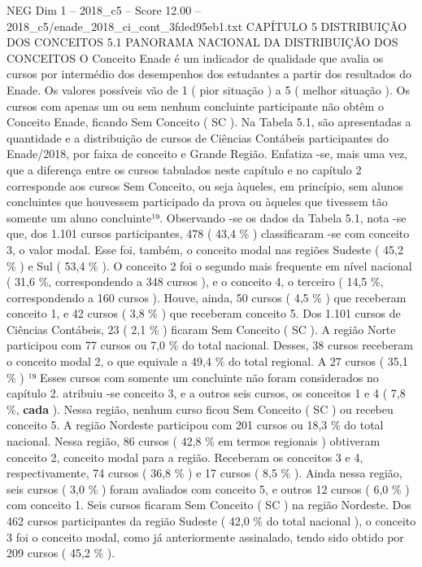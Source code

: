 \begin{textsample}{NEG Dim 1 – 2018\_c5 – Score 12.00 – 2018\_c5/enade\_2018\_ci\_cont\_3fded95eb1.txt}  \label{ex:f1_neg_371}
CAPÍTULO 5 DISTRIBUIÇÃO DOS CONCEITOS 5.1 PANORAMA NACIONAL DA DISTRIBUIÇÃO DOS CONCEITOS O Conceito Enade é um indicador de qualidade que avalia os cursos por intermédio dos desempenhos dos estudantes a partir dos resultados do Enade.
Os valores possíveis vão de 1 ( pior situação ) a 5 ( melhor situação ).
Os cursos com apenas um ou sem nenhum concluinte participante não obtêm o Conceito Enade, ficando Sem Conceito ( SC ).
Na Tabela 5.1, são apresentadas a quantidade e a distribuição de cursos de Ciências Contábeis participantes do Enade/2018, por faixa de conceito e Grande Região.
Enfatiza -se, mais uma vez, que a diferença entre os cursos tabulados neste capítulo e no capítulo 2 corresponde aos cursos Sem Conceito, ou seja àqueles, em princípio, sem alunos concluintes que houvessem participado da prova ou àqueles que tivessem tão somente um aluno concluinte¹⁹.
Observando -se os dados da Tabela 5.1, nota -se que, dos 1.101 cursos participantes, 478 ( 43,4 \% ) classificaram -se com conceito 3, o valor modal.
Esse foi, também, o conceito modal nas regiões Sudeste ( 45,2 \% ) e Sul ( 53,4 \% ).
O conceito 2 foi o segundo mais frequente em nível nacional ( 31,6 \%, correspondendo a 348 cursos ), e o conceito 4, o terceiro ( 14,5 \%, correspondendo a 160 cursos ).
Houve, ainda, 50 cursos ( 4,5 \% ) que receberam conceito 1, e 42 cursos ( 3,8 \% ) que receberam conceito 5.
Dos 1.101 cursos de Ciências Contábeis, 23 ( 2,1 \% ) ficaram Sem Conceito ( SC ).
A região Norte participou com 77 cursos ou 7,0 \% do total nacional.
Desses, 38 cursos receberam o conceito modal 2, o que equivale a 49,4 \% do total regional.
A 27 cursos ( 35,1 \% ) ¹⁹ Esses cursos com somente um concluinte não foram considerados no capítulo 2. atribuiu -se conceito 3, e a outros seis cursos, os conceitos 1 e 4 ( 7,8 \%, \textbf{cada} ).
Nessa região, nenhum curso ficou Sem Conceito ( SC ) ou recebeu conceito 5.
A região Nordeste participou com 201 cursos ou 18,3 \% do total nacional.
Nessa região, 86 cursos ( 42,8 \% em termos regionais ) obtiveram conceito 2, conceito modal para a região.
Receberam os conceitos 3 e 4, respectivamente, 74 cursos ( 36,8 \% ) e 17 cursos ( 8,5 \% ).
Ainda nessa região, seis cursos ( 3,0 \% ) foram avaliados com conceito 5, e outros 12 cursos ( 6,0 \% ) com conceito 1.
Seis cursos ficaram Sem Conceito ( SC ) na região Nordeste.
Dos 462 cursos participantes da região Sudeste ( 42,0 \% do total nacional ), o conceito 3 foi o conceito modal, como já anteriormente assinalado, tendo sido obtido por 209 cursos ( 45,2 \% ).

\end{textsample}
